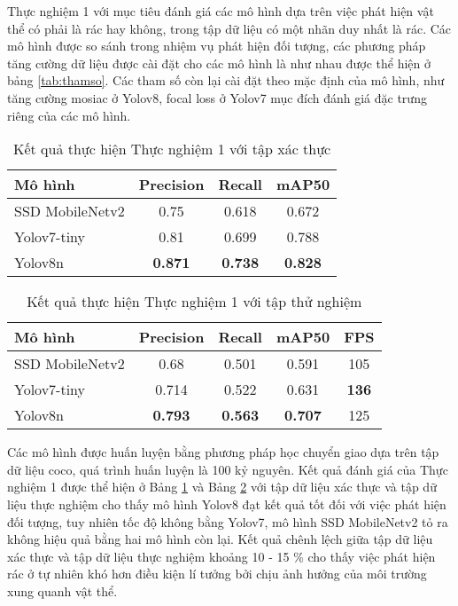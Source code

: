 \documentclass[../the.tex]{subfiles}
\begin{document}
{\fontsize{13}{12} \selectfont
Thực nghiệm 1 với mục tiêu đánh giá các mô hình dựa trên việc phát hiện vật thể có phải là rác hay không, trong tập dữ liệu có một nhãn duy nhất là rác.
Các mô hình được so sánh trong nhiệm vụ phát hiện đối tượng, các phương pháp tăng cường dữ liệu được cài đặt cho các mô hình là như nhau được thể hiện ở bảng \ref{tab:thamso}.
Các tham số còn lại cài đặt theo mặc định của mô hình, như tăng cường mosiac ở Yolov8, focal loss ở Yolov7 mục đích đánh giá đặc trưng riêng của các mô hình.

}
\begin{table}[h!]
    \centering
    \caption{Kết quả thực hiện Thực nghiệm 1 với tập xác thực}
    \begin{tabular}{|l|c|c|c|}
        \hline
        \textbf{Mô hình}  & \textbf{Precision} & \textbf{Recall} & \textbf{mAP50} \\ \hline
        SSD   MobileNetv2 & 0.75               & 0.618           & 0.672          \\ \hline
        Yolov7-tiny       & 0.81               & 0.699           & 0.788          \\ \hline
        Yolov8n           & \textbf{0.871}     & \textbf{0.738}  & \textbf{0.828} \\ \hline
    \end{tabular}
    \label{tab:thucnghiem1.1}
\end{table}

\begin{table}[h!]
    \centering
    \caption{Kết quả thực hiện Thực nghiệm 1 với tập thử nghiệm}
    \begin{tabular}{|l|c|c|c|c|}
        \hline
        \textbf{Mô hình}  & \textbf{Precision} & \textbf{Recall} & \textbf{mAP50} & \multicolumn{1}{l|}{\textbf{FPS}} \\ \hline
        SSD   MobileNetv2 & 0.68               & 0.501           & 0.591          & 105                               \\ \hline
        Yolov7-tiny       & 0.714              & 0.522           & 0.631          & \textbf{136}                      \\ \hline
        Yolov8n           & \textbf{0.793}     & \textbf{0.563}  & \textbf{0.707} & 125                               \\ \hline
    \end{tabular}
    \label{tab:thucnghiem1.2}
\end{table}

{\fontsize{13}{12} \selectfont
    Các mô hình được huấn luyện bằng phương pháp học chuyển giao dựa trên tập dữ liệu coco, quá trình huấn luyện là 100 kỷ nguyên.
    Kết quả đánh giá của Thực nghiệm 1 được thể hiện ở Bảng \ref{tab:thucnghiem1.1} và Bảng \ref{tab:thucnghiem1.2} với tập dữ liệu xác thực và tập dữ liệu thực nghiệm cho thấy mô hình Yolov8 đạt kết quả tốt đối với việc phát hiện đối tượng,
    tuy nhiên tốc độ không bằng Yolov7, mô hình SSD MobileNetv2 tỏ ra không hiệu quả bằng hai mô hình còn lại. Kết quả chênh lệch giữa tập dữ liệu xác thực và tập dữ liệu thực nghiệm khoảng 10 - 15 \% cho thấy việc phát hiện rác ở tự nhiên khó hơn điều kiện lí tưởng bởi chịu ảnh hưởng của môi trường xung quanh vật thể.
}
\end{document}
